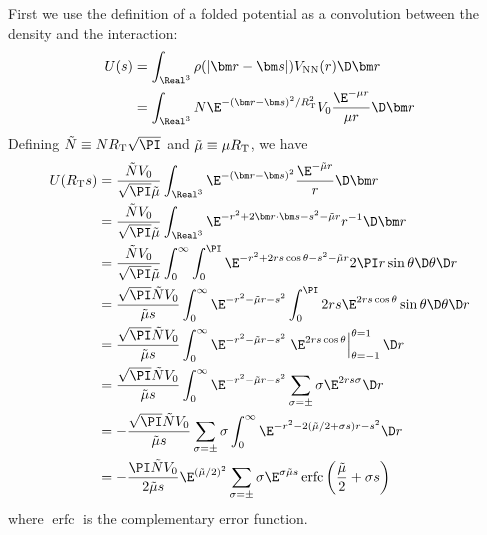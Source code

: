 \documentclass[fleqn, 12pt]{article}
\begin{document}
\begin{enumerate}
  First we use the definition of a folded potential as a convolution between
  the density and the interaction:
  \begin{align*}
    U(s)
    &= \int_{\Real^3} \rho(|\bm r - \bm s|) V_{\text{NN}}(r) \D \bm r \\
    &= \int_{\Real^3} N \E^{-(\bm r - \bm s)^2/R_{\text T}^2} V_0 \frac{\E^{-\mu r}}{\mu r} \D \bm r
  \end{align*}
  Defining $\tilde N \equiv N R_{\text T} \sqrt\PI$ and
  $\tilde \mu \equiv \mu R_{\text T}$, we have
  \begin{align*}
    U(R_{\text T} s)
    &= \frac{\tilde N V_0}{\sqrt\PI \tilde\mu}
      \int_{\Real^3} \E^{-(\bm r - \bm s)^2} \frac{\E^{-\tilde\mu r}}{r} \D \bm r
    \\
    &= \frac{\tilde N V_0}{\sqrt\PI \tilde\mu} \int_{\Real^3} \E^{-r^2 + 2 \bm r \cdot \bm s - s^2 - \tilde\mu r} r^{-1} \D \bm r
    \\
    &= \frac{\tilde N V_0}{\sqrt\PI \tilde\mu} \int_0^\infty \int_0^\PI \E^{-r^2 + 2 r s \cos \theta - s^2 - \tilde\mu r} 2 \PI r \sin \theta \D \theta \D r
    \\
    &= \frac{\sqrt\PI \tilde N V_0}{\tilde\mu s} \int_0^\infty \E^{-r^2 - \tilde\mu r - s^2} \int_0^\PI 2 r s \E^{2 r s \cos \theta} \sin \theta \D \theta \D r
    \\
    &= \frac{\sqrt\PI \tilde N V_0}{\tilde\mu s} \int_0^\infty \E^{-r^2 - \tilde\mu r - s^2} \left.\E^{2 r s \cos \theta}\right|_{\theta=-1}^{\theta=1} \D r
    \\
    &= \frac{\sqrt\PI \tilde N V_0}{\tilde\mu s} \int_0^\infty \E^{-r^2 - \tilde\mu r - s^2} \sum_{\sigma = \pm} \sigma \E^{2 r s \sigma} \D r
    \\
    &= -\frac{\sqrt\PI \tilde N V_0}{\tilde\mu s} \sum_{\sigma = \pm} \sigma \int_0^\infty \E^{-r^2 - 2 (\tilde\mu / 2 + \sigma s) r - s^2}\D r
    \\
    &= -\frac{\PI \tilde N V_0}{2 \tilde\mu s} \E^{(\tilde\mu / 2)^2} \sum_{\sigma  = \pm} \sigma \E^{\sigma \tilde\mu s} \operatorname{erfc}\left(\frac{\tilde\mu}{2} + \sigma s\right)
  \end{align*}
where $\operatorname{erfc}$ is the complementary error function.

\end{enumerate}
\end{document}
